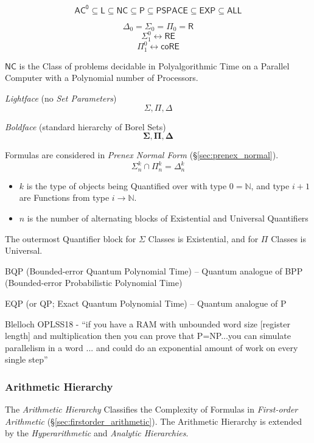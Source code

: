 \[
  \mathsf{AC^0} \subseteq \mathsf{L} \subseteq \mathsf{NC} \subseteq
  \mathsf{P} \subseteq \mathsf{PSPACE} \subseteq \mathsf{EXP}
  \subseteq \mathsf{ALL}
\]

\[
  \Delta_0 = \Sigma_0 = \Pi_0 = \mathsf{R}
\]\[
  \Sigma_1^0 \leftrightarrow \mathsf{RE}
\]\[
  \Pi_1^0 \leftrightarrow \mathsf{coRE}
\]

\emph{$\mathsf{NC}$} is the Class of problems decidable in
Polyalgorithmic Time on a Parallel Computer with a Polynomial number
of Processors.

\emph{Lightface} (no \emph{Set Parameters}) %
\[
  \Sigma, \Pi, \Delta
\]

\emph{Boldface} (standard hierarchy of Borel Sets)
\[
  \mathbf{\Sigma}, \mathbf{\Pi}, \mathbf{\Delta}
\]

Formulas are considered in \emph{Prenex Normal Form}
(\S\ref{sec:prenex_normal}).
\[
  \Sigma^k_n \cap \Pi^k_n = \Delta^k_n
\]
\begin{itemize}
  \item $k$ is the type of objects being Quantified over with type
    $0 = \mathbb{N}$, and type $i + 1$ are Functions from type $i
    \rightarrow \mathbb{N}$.
  \item $n$ is the number of alternating blocks of Existential and
    Universal Quantifiers
\end{itemize}
The outermost Quantifier block for $\Sigma$ Classes is Existential,
and for $\Pi$ Classes is Universal.

BQP (Bounded-error Quantum Polynomial Time) -- Quantum analogue of
BPP (Bounded-error Probabilistic Polynomial Time)

EQP (or QP; Exact Quantum Polynomial Time) -- Quantum analogue of P

Blelloch OPLSS18 - ``if you have a RAM with unbounded word size [register
  length] and multiplication then you can prove that P=NP...you can simulate
parallelism in a word ... and could do an exponential amount of work on every
single step''



\subsubsection{Arithmetic Hierarchy}\label{sec:arithmetic_hierarchy}

The \emph{Arithmetic Hierarchy} Classifies the Complexity of Formulas
in \emph{First-order Arithmetic}
(\S\ref{sec:firstorder_arithmetic}). The Arithmetic Hierarchy is
extended by the \emph{Hyperarithmetic} and \emph{Analytic
  Hierarchies}.

